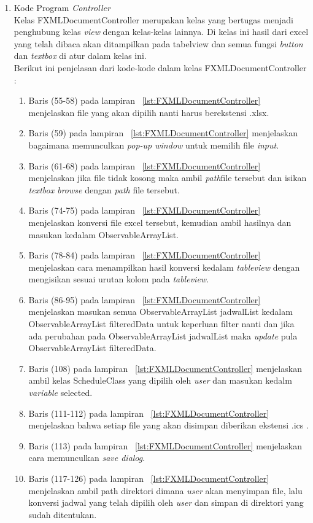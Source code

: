 \begin{enumerate}
\item Kode Program \textit{Controller} \\
Kelas FXMLDocumentController merupakan kelas yang bertugas menjadi penghubung kelas \textit{view} dengan kelas-kelas lainnya. Di kelas ini hasil dari excel yang telah dibaca akan ditampilkan pada tabelview dan semua fungsi \textit{button} dan  \textit{textbox} di atur dalam kelas ini. \\
Berikut ini penjelasan dari kode-kode dalam kelas FXMLDocumentController :
\begin{enumerate}
	\item Baris (55-58) pada lampiran ~\ref{lst:FXMLDocumentController} menjelaskan file yang akan dipilih nanti harus berekstensi .xlsx.
	\item Baris (59) pada lampiran ~\ref{lst:FXMLDocumentController} menjelaskan bagaimana memunculkan \textit{pop-up window} untuk memilih file \textit{input}.
	\item Baris (61-68) pada lampiran ~\ref{lst:FXMLDocumentController} menjelaskan jika file tidak kosong maka ambil \textit{path}file tersebut dan isikan \textit{textbox browse} dengan \textit{path} file tersebut.
	\item Baris (74-75) pada lampiran ~\ref{lst:FXMLDocumentController} menjelaskan konversi file excel tersebut, kemudian ambil hasilnya dan masukan kedalam ObservableArrayList.
	\item Baris (78-84) pada lampiran ~\ref{lst:FXMLDocumentController} menjelaskan cara menampilkan hasil konversi kedalam \textit{tableview} dengan mengisikan sesuai urutan kolom pada \textit{tableview}.
	\item Baris (86-95) pada lampiran ~\ref{lst:FXMLDocumentController} menjelaskan masukan semua ObservableArrayList jadwalList kedalam ObservableArrayList filteredData untuk keperluan filter nanti dan jika ada perubahan pada ObservableArrayList jadwalList maka \textit{update} pula ObservableArrayList filteredData.
	\item Baris (108) pada lampiran ~\ref{lst:FXMLDocumentController} menjelaskan ambil kelas ScheduleClass yang dipilih oleh \textit{user} dan masukan kedalm \textit{variable} selected.
	\item Baris (111-112) pada lampiran ~\ref{lst:FXMLDocumentController} menjelaskan bahwa setiap file yang akan disimpan diberikan ekstensi .ics .
	\item Baris (113) pada lampiran ~\ref{lst:FXMLDocumentController} menjelaskan cara memunculkan \textit{save dialog}.
	\item Baris (117-126) pada lampiran ~\ref{lst:FXMLDocumentController} menjelaskan ambil path direktori dimana \textit{user} akan menyimpan file, lalu konversi jadwal yang telah dipilih oleh \textit{user} dan simpan di direktori yang sudah ditentukan.

\end{enumerate}
\end{enumerate}
